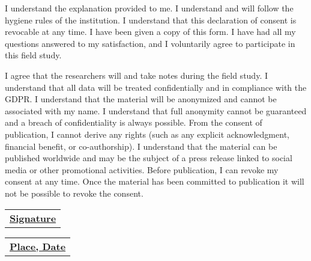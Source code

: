 \begin{Form}

\Square\quad I understand the explanation provided to me. I understand and will follow the hygiene rules of the institution. I understand that this declaration of consent is revocable at any time. I have been given a copy of this form. I have had all my questions answered to my satisfaction, and I voluntarily agree to participate in this field study.\newline

\Square\quad  I agree that the researchers will and take notes during the field study. I understand that all data will be treated confidentially and in compliance with the GDPR. I understand that the material will be anonymized and cannot be associated with my name. I understand that full anonymity cannot be guaranteed and a breach of confidentiality is always possible. From the consent of publication, I cannot derive any rights (such as any explicit acknowledgment, financial benefit, or co-authorship). I understand that the material can be published worldwide and may be the subject of a press release linked to social media or other promotional activities. Before publication, I can revoke my consent at any time. Once the material has been committed to publication it will not be possible to revoke the consent.

\end{Form}

\vfill\noindent
\begin{tabular}[t]{@{}l} 
  \underline{\textbf{Signature}}
\end{tabular}
\hfill%
\begin{tabular}[t]{l@{}}
   \underline{\textbf{Place, Date}}
\end{tabular}
